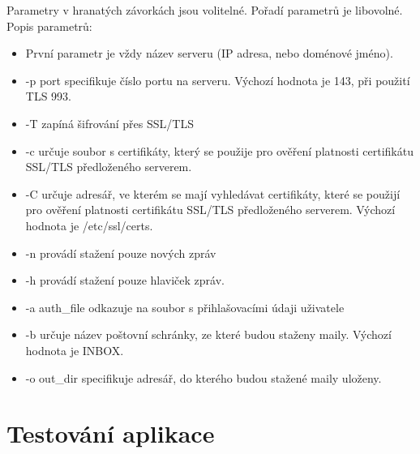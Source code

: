 \documentclass[]{report}
\begin{document}
Parametry v hranatých závorkách jsou volitelné.
Pořadí parametrů je libovolné. Popis parametrů:
\begin{itemize}
	 


\item První parametr je vždy název serveru (IP adresa, nebo doménové jméno).
\item -p port specifikuje číslo portu na serveru. Výchozí hodnota je 143, při použití TLS 993.
\item -T zapíná šifrování přes SSL/TLS
\item -c určuje soubor s certifikáty, který se použije pro ověření platnosti certifikátu SSL/TLS předloženého serverem.
\item -C určuje adresář, ve kterém se mají vyhledávat certifikáty, které se použijí pro ověření platnosti certifikátu SSL/TLS předloženého serverem. Výchozí hodnota je /etc/ssl/certs.
\item -n provádí stažení pouze nových zpráv
\item -h provádí stažení pouze hlaviček zpráv.
\item -a auth\_file odkazuje na soubor s přihlašovacími údaji uživatele
\item -b určuje název poštovní schránky, ze které budou staženy maily. Výchozí hodnota je INBOX.
\item -o out\_dir specifikuje adresář, do kterého budou stažené maily uloženy.
\end{itemize}

\section{Testování aplikace}
\printbibliography
\end{document}
